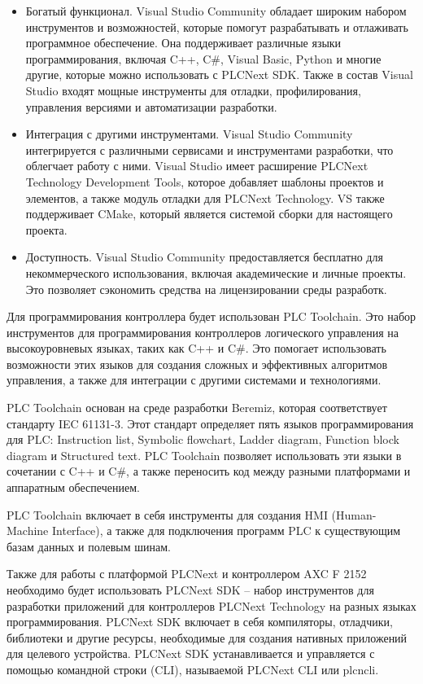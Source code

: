 \begin{itemize}

    \item[-] Богатый функционал. Visual Studio Community обладает широким набором инструментов и возможностей, которые помогут разрабатывать и отлаживать программное обеспечение. Она поддерживает различные языки программирования, включая C++, C\#, Visual Basic, Python и многие другие, которые можно использовать с PLCNext SDK. Также в состав Visual Studio входят мощные инструменты для отладки, профилирования, управления версиями и автоматизации разработки.

    \item[-] Интеграция с другими инструментами. Visual Studio Community интегрируется с различными сервисами и инструментами разработки, что облегчает работу с ними. Visual Studio имеет расширение PLCNext Technology Development Tools, которое добавляет шаблоны проектов и элементов, а также модуль отладки для PLCNext Technology. VS также поддерживает CMake, который является системой сборки для настоящего проекта.
    
    \item[-] Доступность. Visual Studio Community предоставляется бесплатно для некоммерческого использования, включая академические и личные проекты. Это позволяет сэкономить средства на лицензировании среды разработк.

\end{itemize} 	

Для программирования контроллера будет использован PLC Toolchain. Это набор инструментов для программирования контроллеров логического управления на высокоуровневых языках, таких как C++ и C\#. Это помогает использовать возможности этих языков для создания сложных и эффективных алгоритмов управления, а также для интеграции с другими системами и технологиями.

PLC Toolchain основан на среде разработки Beremiz, которая соответствует стандарту IEC 61131-3. Этот стандарт определяет пять языков программирования для PLC: Instruction list, Symbolic flowchart, Ladder diagram, Function block diagram и Structured text. PLC Toolchain позволяет использовать эти языки в сочетании с C++ и C\#, а также переносить код между разными платформами и аппаратным обеспечением.

PLC Toolchain включает в себя инструменты для создания HMI (Human-Machine Interface), а также для подключения программ PLC к существующим базам данных и полевым шинам. 

Также для работы с платформой PLCNext и контроллером AXC F 2152 необходимо будет использовать PLCNext SDK – набор инструментов для разработки приложений для контроллеров PLCNext Technology на разных языках программирования. PLCNext SDK включает в себя компиляторы, отладчики, библиотеки и другие ресурсы, необходимые для создания нативных приложений для целевого устройства. PLCNext SDK устанавливается и управляется с помощью командной строки (CLI), называемой PLCNext CLI или plcncli.

